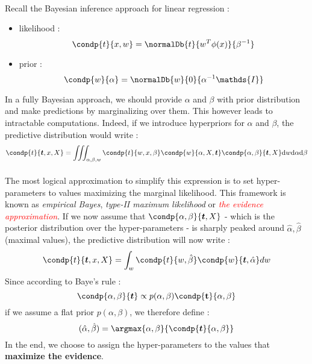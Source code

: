 \documentclass[a4paper]{article}
\begin{document}
{{			\paragraph{}Recall the Bayesian inference approach for linear regression : 
			\begin{itemize}
				\item likelihood : 
					\begin{equation}
						\condp{t}{x,w} = \normalDb{t}{w^T\phi(x)}{\beta^{-1}}
						\label{eq::likelihood}
					\end{equation}
				\item prior : 
					\begin{equation}
						\condp{w}{\alpha} = \normalDb{w}{0}{\alpha^{-1}\mathds{I}}
						\label{eq::prior}
					\end{equation}
			\end{itemize}
			In a fully Bayesian approach, we should provide $\alpha$ and $\beta$ with prior distribution and make predictions by marginalizing over them. This however leads to intractable computations. Indeed, if we introduce hyperpriors for $\alpha$ and $\beta$, the predictive distribution would write : 
			\begin{equation}
				\condp{t}{\boldsymbol{t},x,X} = \iiint_{\alpha,\beta,w}\condp{t}{w,x,\beta}\condp{w}{\alpha,X,\boldsymbol{t}}\condp{\alpha,\beta}{\boldsymbol{t},X}\text{d}w\text{d}\alpha \text{d}\beta
			\end{equation}

			
			\paragraph{} The most logical approximation to simplify this expression is to set hyper-parameters to values maximizing the marginal likelihood. This framework is known as \emph{empirical Bayes}, \emph{type-II maximum likelihood} or \emph{\textcolor{red}{the evidence approximation}}. \newline
			If we now assume that $\condp{\alpha,\beta}{\boldsymbol{t},X}$ - which is the posterior distribution over the hyper-parameters - is sharply peaked around $\hat{\alpha}, \hat{\beta}$ (maximal values), the predictive distribution will now write : 
			\begin{equation}
				\condp{t}{\boldsymbol{t},x,X} = \int_w \condp{t}{w,\hat{\beta}}\condp{w}{\boldsymbol{t},\hat{\alpha}}dw
			\end{equation}
			Since according to Baye's rule : 
			$$
				\condp{\alpha,\beta}{\boldsymbol{t}} \propto p(\alpha,\beta)\condp{\mathbf{t}}{\alpha,\beta}
			$$
			if we assume a flat prior $p(\alpha,\beta)$, we therefore define : 
			\begin{equation}
				(\hat{\alpha},\hat{\beta}) = \argmax{\alpha,\beta}{\condp{\boldsymbol{t}}{\alpha,\beta}}
			\end{equation}
			In the end, we choose to assign the hyper-parameters to the values that \textbf{maximize the evidence}. 
			
}}
\end{document}
